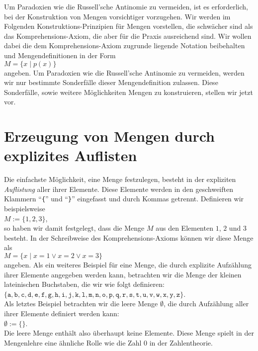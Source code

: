 Um  Paradoxien wie die Russell'sche Antinomie  zu vermeiden, ist es erforderlich, bei der
Konstruktion von Mengen vorsichtiger vorzugehen.
Wir werden im Folgenden Konstruktions-Prinzipien f\"{u}r Mengen vorstellen,
die schw\"{a}cher sind als das Komprehensions-Axiom, die aber f\"{u}r die Praxis 
ausreichend sind.  Wir wollen dabei die dem Komprehensions-Axiom zugrunde liegende Notation 
beibehalten und Mengendefinitionen in der Form 
\\[0.2cm]
\hspace*{1.3cm}
$M = \{ x \mid p(x) \}$  
\\[0.2cm]
angeben.  Um Paradoxien wie die Russell'sche Antinomie zu vermeiden, werden wir nur bestimmte
Sonderf\"{a}lle dieser Mengendefinition zulassen.  Diese Sonderf\"{a}lle, sowie weitere M\"{o}glichkeiten
Mengen zu konstruieren, stellen wir jetzt vor.

\section{Erzeugung von Mengen durch explizites Auflisten}
Die einfachste M\"{o}glichkeit, eine Menge festzulegen, besteht in der expliziten
\emph{Auflistung} aller ihrer Elemente. Diese Elemente werden in den geschweiften
Klammern ``\texttt{\{}'' und ``\texttt{\}}'' eingefasst und durch Kommas getrennt.
Definieren wir beispielsweise \\[0.2cm]
\hspace*{1.3cm} $M := \{ 1, 2, 3 \}$, \\[0.2cm]
so haben wir damit festgelegt, dass die Menge $M$ aus den Elementen $1$, $2$ und $3$
besteht. In der Schreibweise des Komprehensions-Axioms k\"{o}nnen wir diese Menge als \\[0.2cm]
\hspace*{1.3cm} $M = \{ x \mid x = 1 \vee x = 2 \vee x = 3 \}$ \\[0.2cm]
angeben.
Als ein weiteres Beispiel f\"{u}r eine Menge, die durch explizite Aufz\"{a}hlung ihrer Elemente
angegeben werden kann, betrachten wir die Menge der kleinen lateinischen Buchstaben, die wir wie folgt
definieren: \\[0.2cm]
\hspace*{1.3cm} 
$\{\mathtt{a}, \mathtt{b}, \mathtt{c}, \mathtt{d}, \mathtt{e},
 \mathtt{f}, \mathtt{g}, \mathtt{h}, \mathtt{i}, \mathtt{j}, \mathtt{k}, \mathtt{l},
 \mathtt{m}, \mathtt{n}, \mathtt{o}, \mathtt{p}, \mathtt{q}, \mathtt{r}, \mathtt{s},
 \mathtt{t}, \mathtt{u}, \mathtt{v}, \mathtt{w}, \mathtt{x}, \mathtt{y}, \mathtt{z\}}$.
 \\[0.2cm]
Als letztes Beispiel betrachten wir die leere Menge $\emptyset$, die durch
Aufz\"{a}hlung aller ihrer Elemente definiert werden kann:
\\[0.2cm]
\hspace*{1.3cm}
$\emptyset := \{\}$.
\\[0.2cm]
Die leere Menge enth\"{a}lt also \"{u}berhaupt keine Elemente.  Diese Menge spielt in der Mengenlehre eine
\"{a}hnliche Rolle wie die Zahl $0$ in der Zahlentheorie.

